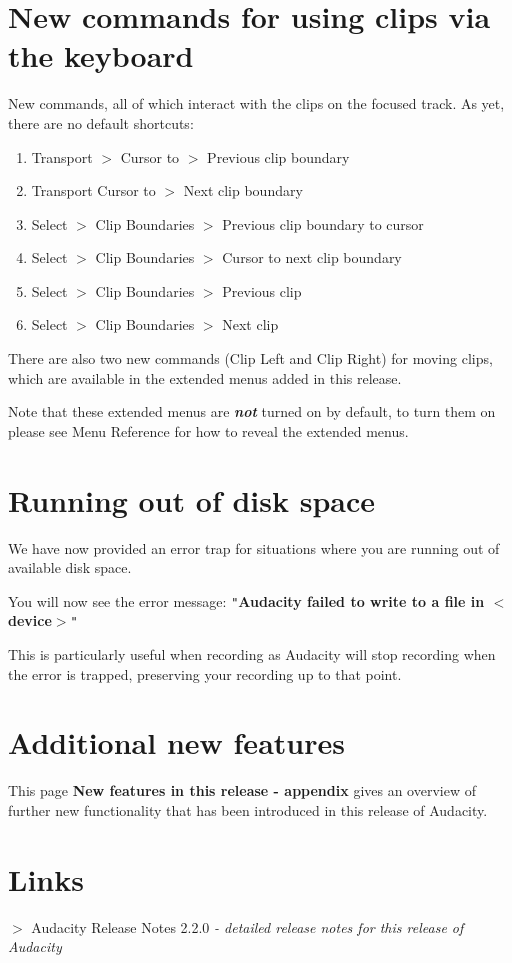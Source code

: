 \section{New commands for using clips via the keyboard}


New commands, all of which interact with the clips on the focused track. As yet, there are no default shortcuts:
\begin{enumerate}
\item Transport \mbox{$>$} Cursor to \mbox{$>$} Previous clip boundary
\item Transport Cursor to \mbox{$>$} Next clip boundary
\item Select \mbox{$>$} Clip Boundaries \mbox{$>$} Previous clip boundary to cursor 
\item Select \mbox{$>$} Clip Boundaries \mbox{$>$} Cursor to next clip boundary 
\item Select \mbox{$>$} Clip Boundaries \mbox{$>$} Previous clip 
\item Select \mbox{$>$} Clip Boundaries \mbox{$>$} Next clip 
\end{enumerate}
There are also two new commands (Clip Left and Clip Right) for moving clips, which are available in the extended menus added in this release.

Note that these extended menus are \textit{\textbf{not}} turned on by default, to turn them on please see Menu Reference for how to reveal the extended menus.


\section{Running out of disk space}


We have now provided an error trap for situations where you are running out of available disk space.

You will now see the error message:
\texttt{{}"{}}\textbf{Audacity failed to write to a file in \mbox{$<$}device\mbox{$>$}}\texttt{{}"{}}

This is particularly useful when recording as Audacity will stop recording when the error is trapped, preserving your recording up to that point.


\section{Additional new features}


This page \textbf{New features in this release - appendix} gives an overview of further new functionality that has been introduced in this release of Audacity.


\section{Links}


\textbf{\mbox{$>$}} Audacity Release Notes 2.2.0 \textit{- detailed release notes for this release of Audacity}%
																					
